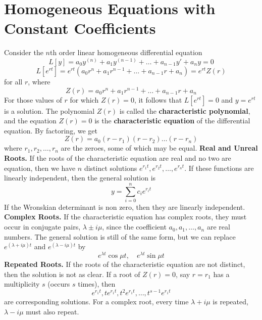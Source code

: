 \section{Homogeneous Equations with Constant Coefficients}
    Consider the $n$th order linear homogeneous differential equation
    $$L[y] = a_0y^{(n)} + a_1y^{(n-1)} + \dots + a_{n-1}y' + a_ny = 0$$
    $$L[e^{rt}] = e^{rt}(a_0r^n + a_1r^{n-1} + \dots + a_{n-1}r + a_n) = e^{rt}Z(r)$$
    for all $r$, where
    $$Z(r) = a_0r^n + a_1r^{n-1} + \dots + a_{n-1}r + a_n$$
    For those values of $r$ for which $Z(r) = 0$, it follows that $L[e^{rt}] = 0$ and $y = e^{rt}$ is a solution. The polynomial $Z(r)$ is called the \textbf{characteristic polynomial}, and the equation $Z(r) = 0$ is the \textbf{characteristic equation} of the differential equation. By factoring, we get
    $$Z(r) = a_0(r - r_1)(r - r_2)\dots(r-r_n)$$
    where $r_1,r_2,\dots,r_n$ are the zeroes, some of which may be equal.
    \newline
    \textbf{Real and Unreal Roots.} If the roots of the characteristic equation are real and no two are equation, then we have $n$ distinct solutions $e^{r_1t}, e^{r_2t},\dots,e^{r_nt}$. If these functions are linearly independent, then the general solution is
    $$y = \sum_{i=0}^n c_ie^{r_it}$$
    If the Wronskian determinant is non zero, then they are linearly independent.
    \newline
    \textbf{Complex Roots.} If the characteristic equation has complex roots, they must occur in conjugate pairs, $\lambda \pm i\mu$, since the coefficient $a_0, a_1,\dots, a_n$ are real numbers. The general solution is still of the same form, but we can replace $e^{(\lambda + i\mu)t}$ and $e^{(\lambda - i\mu)t}$ by
    $$e^{\lambda t}\cos\mu t, \quad e^{\lambda t}\sin \mu t$$
    \textbf{Repeated Roots.} If the roots of the characteristic equation are not distinct, then the solution is not as clear. If a root of $Z(r) = 0$, say $r = r_1$ has a multiplicity $s$ (occurs $s$ times), then
    $$e^{r_1t}, te^{r_1t}, t^2e^{r_1t},\dots,t^{s-1}e^{r_1t}$$
    are corresponding solutions. For a complex root, every time $\lambda + i\mu$ is repeated, $\lambda - i\mu$ must also repeat.
